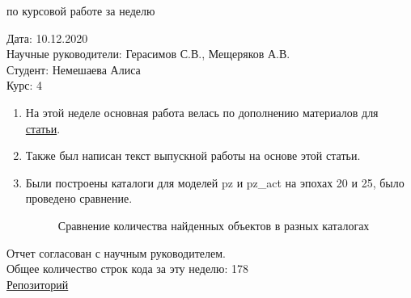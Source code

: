 \documentclass{article}
\begin{document}
\begin{center}{ по курсовой работе за неделю\\}\end{center}
Дата: 10.12.2020\\
Научные руководители: Герасимов С.В., Мещеряков А.В.\\
Студент: Немешаева Алиса\\
Курс: 4\\

\renewcommand{\labelitemi}{$\blacksquare$}
\renewcommand\labelitemii{$\square$}
\begin{enumerate}
    \item На этой неделе основная работа велась по дополнению материалов для 
        \href{https://www.overleaf.com/read/zcgvtyscsyhv}{статьи}.\\
    \item Также был написан текст выпускной работы на основе этой статьи.\\
    \item Были построены каталоги для моделей pz и pz\_act на эпохах 20 и 25, было проведено 
        сравнение.\\

        \begin{figure}[h]
            \caption{Сравнение количества найденных объектов в разных каталогах}
        \end{figure}
\end{enumerate}

Отчет согласован с научным руководителем.\\
Общее количество строк кода за эту неделю: 178\\
\href{https://github.com/rt2122/data-segmentation-2}{Репозиторий}\\ 
\end{document}
